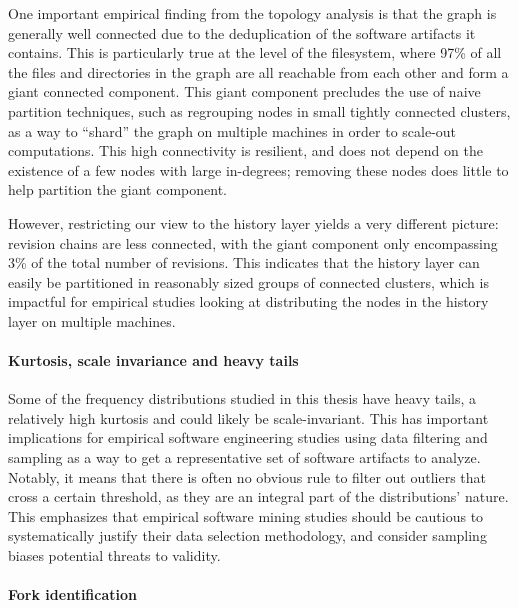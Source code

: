 One important empirical finding from the topology analysis is that the graph is
generally well connected due to the deduplication of the software artifacts it
contains. This is particularly true at the level of the filesystem, where 97\%
of all the files and directories in the graph are all reachable from each other
and form a giant connected component. This giant component precludes the use of
naive partition techniques, such as regrouping nodes in small tightly connected
clusters, as a way to ``shard'' the graph on multiple machines in order to
scale-out computations. This high connectivity is resilient, and does not
depend on the existence of a few nodes with large in-degrees; removing these
nodes does little to help partition the giant component.

However, restricting our view to the history layer yields a very different
picture: revision chains are less connected, with the giant component only
encompassing 3\% of the total number of revisions. This indicates that the
history layer can easily be partitioned in reasonably sized groups of connected
clusters, which is impactful for empirical studies looking at distributing the
nodes in the history layer on multiple machines.

\paragraph*{Kurtosis, scale invariance and heavy tails}

Some of the frequency distributions studied in this thesis have heavy tails,
a relatively high kurtosis and could likely be scale-invariant. This has
important implications for empirical software engineering studies using data
filtering and sampling as a way to get a representative set of software
artifacts to analyze. Notably, it means that there is often no obvious rule to
filter out outliers that cross a certain threshold, as they are an integral
part of the distributions' nature. This emphasizes that empirical software
mining studies should be cautious to systematically justify their data
selection methodology, and consider sampling biases potential threats to
validity.

\paragraph*{Fork identification}

